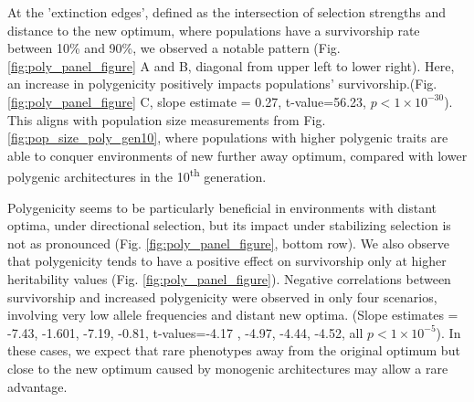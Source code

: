 \documentclass{article}
\begin{document}
At the 'extinction edges', defined as the intersection of selection strengths and distance to the new optimum, where populations have a survivorship rate between 10\% and 90\%, we observed a notable pattern (Fig. \ref{fig:poly_panel_figure} A and B, diagonal from upper left to lower right). Here, an increase in polygenicity positively impacts populations' survivorship.(Fig. \ref{fig:poly_panel_figure} C, slope estimate = 0.27, t-value=56.23, $p<1 \times 10^{-30}$). This aligns with population size measurements from Fig. \ref{fig:pop_size_poly_gen10}, where populations with higher polygenic traits are able to conquer environments of new further away optimum, compared with lower polygenic architectures in the 10\textsuperscript{th} generation.

Polygenicity seems to be particularly beneficial in environments with distant optima, under directional selection, but its impact under stabilizing selection is not as pronounced (Fig. \ref{fig:poly_panel_figure}, bottom row). We also observe that polygenicity tends to have a positive effect on survivorship only at higher heritability values (Fig. \ref{fig:poly_panel_figure}). Negative correlations between survivorship and increased polygenicity were observed in only four scenarios, involving very low allele frequencies and distant new optima. (Slope estimates = -7.43, -1.601, -7.19, -0.81, t-values=-4.17 , -4.97, -4.44, -4.52, all $p<1 \times 10^{-5}$). In these cases, we expect that rare phenotypes away from the original optimum but close to the new optimum caused by monogenic architectures may allow a rare advantage.
\end{document}
